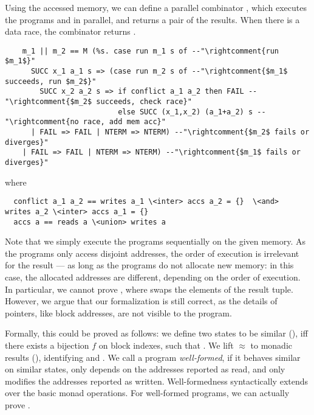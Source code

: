 \documentclass[runningheads]{llncs}
\begin{document}
  Using the accessed memory, we can define a parallel combinator ,
  which executes the programs  and  in parallel, and returns a pair of the results.
  When there is a data race, the combinator returns .
  \begin{lstlisting}
    m_1 || m_2 == M (%s. case run m_1 s of --"\rightcomment{run $m_1$}"
      SUCC x_1 a_1 s => (case run m_2 s of --"\rightcomment{$m_1$ succeeds, run $m_2$}"
        SUCC x_2 a_2 s => if conflict a_1 a_2 then FAIL --"\rightcomment{$m_2$ succeeds, check race}"
                          else SUCC (x_1,x_2) (a_1+a_2) s --"\rightcomment{no race, add mem acc}"
      | FAIL => FAIL | NTERM => NTERM) --"\rightcomment{$m_2$ fails or diverges}"
    | FAIL => FAIL | NTERM => NTERM) --"\rightcomment{$m_1$ fails or diverges}"
  \end{lstlisting}
  where
  \begin{lstlisting}
  conflict a_1 a_2 == writes a_1 \<inter> accs a_2 = {}  \<and>  writes a_2 \<inter> accs a_1 = {}
  accs a == reads a \<union> writes a
  \end{lstlisting}

  Note that we simply execute the programs sequentially on the given memory.
  As the programs only access disjoint addresses, the order of execution is irrelevant for the result
  --- as long as the programs do not allocate new memory:
  in this case, the allocated addresses are different, depending on the order of execution.
  In particular, we cannot prove , where  swaps the elements of the result tuple.
  However, we argue that our formalization is still correct, as the details of pointers,
  like block addresses, are not visible to the program.

  Formally, this could be proved as follows:
  we define two states to be similar
  (), iff there exists a bijection \is$f$ on block indexes, such that .
  We lift $\approx$ to monadic results (), identifying  and .
  We call a program \emph{well-formed}, if it behaves similar on similar states,
  only depends on the addresses reported as read, and only modifies the addresses reported as written.
  Well-formedness syntactically extends over the basic monad operations. For well-formed programs,
  we can actually prove .
\end{document}
